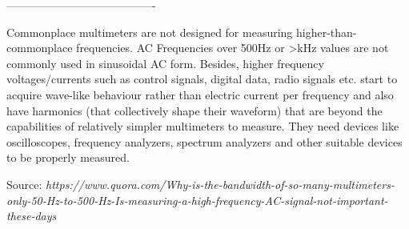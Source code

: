 \documentclass[a4paper]{article}
\begin{document}
\begin{enumerate}
\begin{example}
        ----------------------------------------

        Commonplace multimeters are not designed for measuring higher-than-commonplace frequencies. AC Frequencies over 500Hz or >kHz values are not commonly used in sinusoidal AC form. Besides, higher frequency voltages/currents such as control signals, digital data, radio signals etc. start to acquire wave-like behaviour rather than electric current per frequency and also have harmonics (that collectively shape their waveform) that are beyond the capabilities of relatively simpler multimeters to measure. They need devices like oscilloscopes, frequency analyzers, spectrum analyzers and other suitable devices to be properly measured.

        Source: \textit{https://www.quora.com/Why-is-the-bandwidth-of-so-many-multimeters-only-50-Hz-to-500-Hz-Is-measuring-a-high-frequency-AC-signal-not-important-these-days}
    \end{example}
\end{enumerate}
\end{document}
